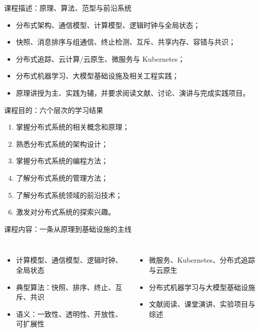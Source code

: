 \documentclass[UTF8,fontset=none,aspectratio=169,10pt]{beamer}
\begin{document}
\begin{frame}{课程描述：原理、算法、范型与前沿系统}
\small
\begin{itemize}
  \item 分布式架构、通信模型、计算模型、逻辑时钟与全局状态；
  \item 快照、消息排序与组通信、终止检测、互斥、共享内存、容错与共识；
  \item 分布式追踪、云计算/云原生、微服务与 Kubernetes；
  \item 分布式机器学习、大模型基础设施及相关工程实践；
  \item 原理讲授为主、实践为辅，并要求阅读文献、讨论、演讲与完成实践项目。
\end{itemize}
\vfill
{}
\end{frame}

\begin{frame}{课程目的：六个层次的学习结果}
\begin{enumerate}
  \item 掌握分布式系统的相关概念和原理；
  \item 熟悉分布式系统的架构设计；
  \item 掌握分布式系统的编程方法；
  \item 了解分布式系统的管理方法；
  \item 了解分布式系统领域的前沿技术；
  \item 激发对分布式系统的探索兴趣。
\end{enumerate}
\vfill
{}
\end{frame}

\begin{frame}{课程内容：一条从原理到基础设施的主线}
\begin{columns}[T,onlytextwidth]
\begin{itemize}\item 计算模型、通信模型、逻辑时钟、全局状态\item 典型算法：快照、排序、终止、互斥、共识\item 语义：一致性、透明性、开放性、可扩展性\end{itemize}
\begin{itemize}\item 微服务、Kubernetes、分布式追踪与云原生\item 分布式机器学习与大模型基础设施\item 文献阅读、课堂演讲、实验项目与综述\end{itemize}
\end{columns}
\vfill{}
\end{frame}
\end{document}
